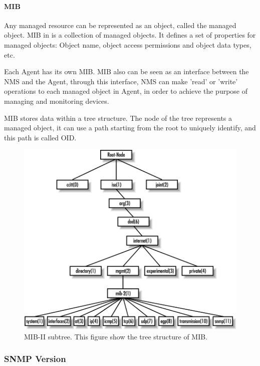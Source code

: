 \paragraph{MIB}

Any managed resource can be represented as an object, called the managed object. MIB in\cite{rfc1493}\cite{rfc4188} is a collection of managed objects. It defines a set of properties for managed objects: Object name, object access permissions and object data types, etc.  

Each Agent has its own MIB. MIB also can be seen as an interface between the NMS and the Agent, through this interface, NMS can make 'read' or 'write' operations to each managed object in Agent, in order to achieve the purpose of managing and monitoring devices.  

MIB stores data within a tree structure. The node of the tree represents a managed object, it can use a path starting from the root to uniquely identify, and this path is called OID.

\begin{figure}[!ht]
	\caption{MIB-II subtree. This figure show the tree structure of MIB.}
	\includegraphics[width=\textwidth]{images/MIBsubtree}
\end{figure}

\subsubsection{SNMP Version}


